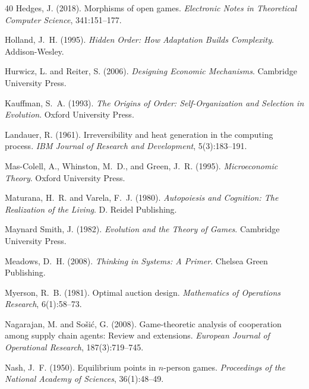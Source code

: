 \documentclass[12pt,a4paper,twocolumn]{article}
\begin{document}
\begin{thebibliography}{40}
Hedges, J. (2018).
\newblock Morphisms of open games.
\newblock \emph{Electronic Notes in Theoretical Computer Science}, 341:151--177.

Holland, J.~H. (1995).
\newblock \emph{Hidden Order: How Adaptation Builds Complexity}.
\newblock Addison-Wesley.

Hurwicz, L. and Reiter, S. (2006).
\newblock \emph{Designing Economic Mechanisms}.
\newblock Cambridge University Press.

Kauffman, S.~A. (1993).
\newblock \emph{The Origins of Order: Self-Organization and Selection in Evolution}.
\newblock Oxford University Press.

Landauer, R. (1961).
\newblock Irreversibility and heat generation in the computing process.
\newblock \emph{IBM Journal of Research and Development}, 5(3):183--191.

Mas-Colell, A., Whinston, M.~D., and Green, J.~R. (1995).
\newblock \emph{Microeconomic Theory}.
\newblock Oxford University Press.

Maturana, H.~R. and Varela, F.~J. (1980).
\newblock \emph{Autopoiesis and Cognition: The Realization of the Living}.
\newblock D. Reidel Publishing.

{Maynard Smith}, J. (1982).
\newblock \emph{Evolution and the Theory of Games}.
\newblock Cambridge University Press.

Meadows, D.~H. (2008).
\newblock \emph{Thinking in Systems: A Primer}.
\newblock Chelsea Green Publishing.

Myerson, R.~B. (1981).
\newblock Optimal auction design.
\newblock \emph{Mathematics of Operations Research}, 6(1):58--73.

Nagarajan, M. and So\v{s}i\'{c}, G. (2008).
\newblock Game-theoretic analysis of cooperation among supply chain agents:
  Review and extensions.
\newblock \emph{European Journal of Operational Research}, 187(3):719--745.

Nash, J.~F. (1950).
\newblock Equilibrium points in $n$-person games.
\newblock \emph{Proceedings of the National Academy of Sciences}, 36(1):48--49.


\end{thebibliography}
\end{document}
